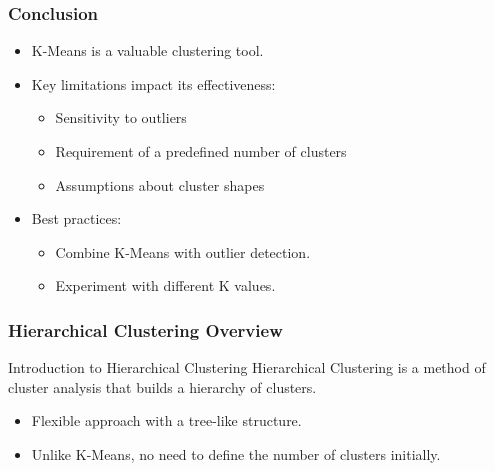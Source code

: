 \documentclass[aspectratio=169]{beamer}
\begin{document}
\begin{frame}[fragile]
    \frametitle{Conclusion}
    \begin{itemize}
        \item K-Means is a valuable clustering tool.
        \item Key limitations impact its effectiveness: 
        \begin{itemize}
            \item Sensitivity to outliers
            \item Requirement of a predefined number of clusters
            \item Assumptions about cluster shapes
        \end{itemize}
        \item Best practices:
        \begin{itemize}
            \item Combine K-Means with outlier detection.
            \item Experiment with different K values.
        \end{itemize}
    \end{itemize}
\end{frame}

\begin{frame}[fragile]
    \frametitle{Hierarchical Clustering Overview}
    \begin{block}{Introduction to Hierarchical Clustering}
        Hierarchical Clustering is a method of cluster analysis that builds a hierarchy of clusters.
        \begin{itemize}
            \item Flexible approach with a tree-like structure.
            \item Unlike K-Means, no need to define the number of clusters initially.
        \end{itemize}
    \end{block}
\end{frame}
\end{document}
